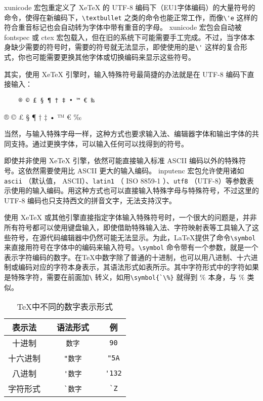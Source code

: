 xunicode 宏包重定义了 XeTeX 的 UTF-8 编码下（EU1字体编码）的大量符号的命令，使得在新编码下，\verb|\textbullet| 之类的命令也能正常工作，而像\verb|\'e|  这样的符合重音标记也会自动转为字体中带有重音的字母。 xunicode 宏包会自动被 fontspec 或 ctex 宏包载入，但在旧的系统下可能需要手工完成。不过，当字体本身缺少需要的符号时，需要的符号就无法显示，即使使用的是\verb|\'| 这样的复合形式，你也可能需要更换其他字体或切换编码来显示这些符号。

其实，使用 XeTeX 引擎时，输入特殊符号最简捷的办法就是在 UTF-8 编码下直接输入：

\begin{minipage}[t]{0.45\textwidth}
\begin{lstlisting}
    ® © £ § ¶ † ‡ • ™ € ‰
\end{lstlisting}
\end{minipage}
\hfill
\begin{minipage}[t]{0.45\textwidth}
    ® © £ § ¶ † ‡ • ™ € ‰
\end{minipage}

当然，与输入特殊字母一样，这种方式也要求输入法、编辑器字体和输出字体的共同支持。通过更换字体，可以输入任何可以找得到的符号。

即使并非使用 XeTeX 引擎，依然可能直接输入标准 ASCII 编码以外的特殊符号。这依然需要使用比 ASCII 更大的输入编码。 inputenc 宏包允许使用诸如 \verb|ascii| （默认值， ASCII）、\verb|latin1| （ ISO 8859-1 ）、\verb|utf8| （UTF-8）等参数表示使用的输入编码。用这种方式也可以直接输入特殊字母与特殊符号，不过这里的 UTF-8 编码也只支持西文的拼音文字，无法支持汉字。

使用 XeTeX 或其他引擎直接指定字体输入特殊符号时，一个很大的问题是，并非所有符号都可以使用键盘输入，即使借助特殊输入法、字符映射表等工具输入了这些符号，在源代码编辑器中仍然可能无法显示。为此，\LaTeX 提供了命令\verb|\symbol| 来直接用符号在字体中的编码来输入符号。\verb|\symbol| 命令带有一个参数，就是一个表示字符编码的数字。在\TeX 中数字除了普通的十进制，也可以用八进制、十六进制或编码对应的字符本身表示，其语法形式如表所示。其中字符形式中的字符如果是特殊字符，需要在前面加\verb|\| 转义，如用\verb|\symbol{`\%}| 就得到 \% 本身，与 \% 类似。

\begin{table}[H]
    \centering
    \caption{\TeX 中不同的数字表示形式}
    \label{tab:number}
    \begin{tabular}{ccccc}
        \toprule
        表示法 && 语法形式 && 例 \\ 
        \midrule
        十进制 && \verb|数字| && \verb|90| \\ 
        十六进制 && \verb|"数字| && \verb|"5A| \\ 
        八进制 && \verb|'数字| && \verb|'132| \\ 
        字符形式 && \verb|`数字| && \verb|`Z| \\
        \bottomrule
    \end{tabular}
\end{table}

